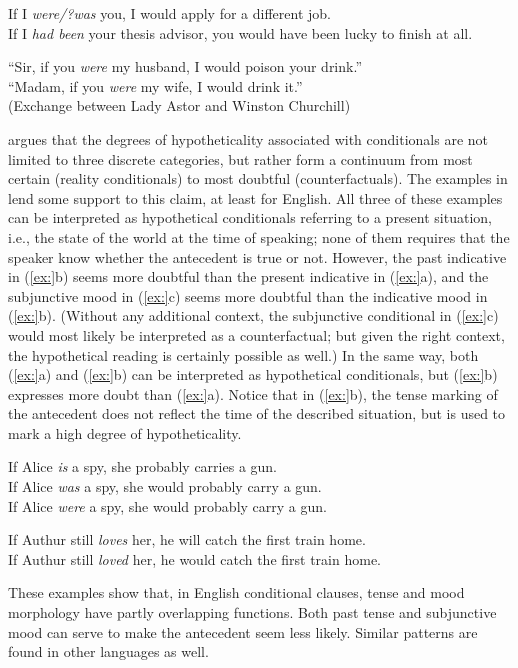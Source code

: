 \ea
\ea If I \textit{were/?was} you, I would apply for a different job.\\
\ex If I \textit{had been} your thesis advisor, you would have been lucky to finish at all.
                       \z
\z

\ea
“Sir, if you \textit{were} my husband, I would poison your drink.”\\
“Madam, if you \textit{were} my wife, I would drink it.”\\
  (Exchange between Lady Astor and Winston Churchill)
\z


\citet{Comrie1986} argues that the degrees of hypotheticality associated with conditionals are not limited to three discrete categories, but rather form a continuum from most certain (reality conditionals) to most doubtful (counterfactuals). The examples in  lend some support to this claim, at least for English. All three of these examples can be interpreted as hypothetical conditionals referring to a present situation, i.e., the state of the world at the time of speaking; none of them requires that the speaker know whether the antecedent is true or not. However, the past indicative in (\ref{ex:}b) seems more doubtful than the present indicative in (\ref{ex:}a), and the subjunctive mood in (\ref{ex:}c) seems more doubtful than the indicative mood in (\ref{ex:}b). (Without any additional context, the subjunctive conditional in (\ref{ex:}c) would most likely be interpreted as a counterfactual; but given the right context, the hypothetical reading is certainly possible as well.) In the same way, both (\ref{ex:}a) and (\ref{ex:}b) can be interpreted as hypothetical conditionals, but (\ref{ex:}b) expresses more doubt than (\ref{ex:}a). Notice that in (\ref{ex:}b), the tense marking of the antecedent does not reflect the time of the described situation, but is used to mark a high degree of hypotheticality.


\ea
\ea If Alice \textit{is} a spy, she probably carries a gun.\\
\ex If Alice \textit{was} a spy, she would probably carry a gun.\\
\ex If Alice \textit{were} a spy, she would probably carry a gun.
                       \z
\z

\ea
\ea If Authur still \textit{loves} her, he will catch the first train home.\\
\ex If Authur still \textit{loved} her, he would catch the first train home.
                       \z
\z


These examples show that, in English conditional clauses, tense and mood morphology have partly overlapping functions. Both past tense and subjunctive mood can serve to make the antecedent seem less likely. Similar patterns are found in other languages as well.



